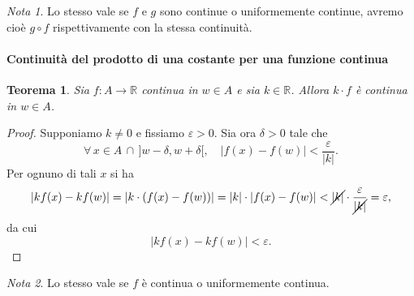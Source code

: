 \documentclass{article}
\theoremstyle{plain}
\newtheorem{thm}{Teorema}[section]
\theoremstyle{definition}
\theoremstyle{remark}
\newtheorem{note}{Nota}
\begin{document}
\vspace{10pt}

\begin{note}
    Lo stesso vale se $f$ e $g$ sono continue o uniformemente continue, avremo cioè $g\circ f$ rispettivamente con la stessa continuità.
\end{note}

\vspace{10pt}

\paragraph{Continuità del prodotto di una costante per una funzione continua}
\begin{bxthm}
\begin{thm}
    Sia $f:A\to\mathbb{R}$ continua in $w\in A$ e sia $k\in\mathbb{R}$.
    Allora $k\cdot f$ è continua in $w\in A$.
\end{thm}
\end{bxthm}
\begin{proof}
    Supponiamo $k\neq 0$ e fissiamo $\varepsilon>0$. 
    Sia ora $\delta>0$ tale che 
    \[\forall\, x\in A\,\cap\, ]w-\delta,w+\delta[,\quad|f(x)-f(w)|<\dfrac{\varepsilon}{|k|}.\]
    Per ognuno di tali $x$ si ha 
    \[ |kf(x)-kf(w)|=|k\cdot(f(x)-f(w))|=|k|\cdot |f(x)-f(w)|<\cancel{|k|}\cdot \frac{\varepsilon}{\cancel{|k|}}=\varepsilon, \]
    da cui \[|kf(x)-kf(w)|<\varepsilon.\]
\end{proof}

\vspace{10pt}

\begin{note}
    Lo stesso vale se $f$ è continua o uniformemente continua.
\end{note}

\vspace{10pt}
\end{document}
